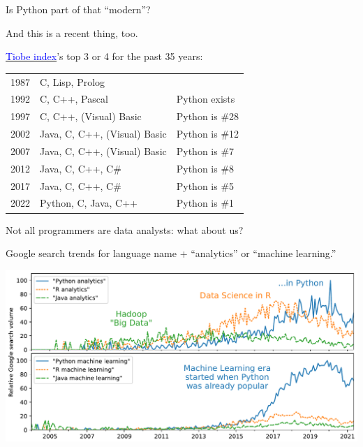 \documentclass[aspectratio=169]{beamer}
\begin{document}
\begin{frame}{Is Python part of that ``modern''?}
\large
\vspace{0.25 cm}

And this is a recent thing, too.

\vspace{0.25 cm}
\href{https://www.tiobe.com/tiobe-index/}{\textcolor{blue}{Tiobe index}}'s top 3 or 4 for the past 35 years:

\renewcommand{\arraystretch}{1.25}
\begin{center}
\begin{tabular}{c l l}
1987 & C, Lisp, Prolog                 & \\
1992 & C, C++, Pascal                  & Python exists \\
1997 & C, C++, (Visual) Basic          & Python is \#28 \\
2002 & Java, C, C++, (Visual) Basic    & Python is \#12 \\
2007 & Java, C, C++, (Visual) Basic    & Python is \#7 \\
2012 & Java, C, C++, C\#               & Python is \#8 \\
2017 & Java, C, C++, C\#               & Python is \#5 \\
2022 & Python, C, Java, C++            & Python is \#1 \\
\end{tabular}
\end{center}
\end{frame}

\begin{frame}{Not all programmers are data analysts: what about us?}
\vspace{0.25 cm}

Google search trends for language name + ``analytics'' or ``machine learning.''

\includegraphics[width=\linewidth]{PLOTS/analytics-by-language.pdf}
\end{frame}
\end{document}
